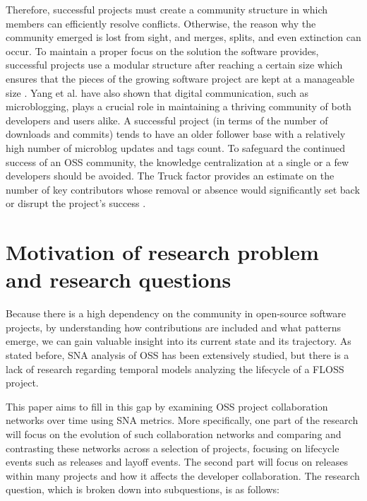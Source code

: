 Therefore, successful projects must create a community structure in which members can efficiently resolve conflicts. Otherwise, the reason why the community emerged is lost from sight, and merges, splits, and even extinction can occur. To maintain a proper focus on the solution the software provides, successful projects use a modular structure after reaching a certain size which ensures that the pieces of the growing software project are kept at a manageable size \cite{antwerpEvolutionOpenSource2010}. Yang et al. \cite{yangHowMicrobloggingNetworks2013} have also shown that digital communication, such as microblogging, plays a crucial role in maintaining a thriving community of both developers and users alike. A successful project (in terms of the number of downloads and commits) tends to have an older follower base with a relatively high number of microblog updates and tags count. To safeguard the continued success of an OSS community, the knowledge centralization at a single or a few developers should be avoided. The Truck factor provides an estimate on the number of key contributors whose removal or absence would significantly set back or disrupt the project's success \cite{avelinoNovelApproachEstimating2016}.


\section{Motivation of research problem and research questions}
\label{sec:motivation-rq}
Because there is a high dependency on the community in open-source software projects, by understanding how contributions are included and what patterns emerge, we can gain valuable insight into its current state and its trajectory. As stated before, SNA analysis of OSS has been extensively studied, but there is a lack of research regarding temporal models analyzing the lifecycle of a FLOSS project.

This paper aims to fill in this gap by examining OSS project collaboration networks over time using SNA metrics. More specifically, one part of the research will focus on the evolution of such collaboration networks and comparing and contrasting these networks across a selection of projects, focusing on lifecycle events such as releases and layoff events. The second part will focus on releases within many projects and how it affects the developer collaboration. The research question, which is broken down into subquestions, is as follows:

